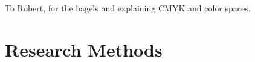 \documentclass[acmtog]{acmart}
\begin{document}
\begin{acks}
To Robert, for the bagels and explaining CMYK and color spaces.
\end{acks}





\appendix

\section{Research Methods}
\end{document}
